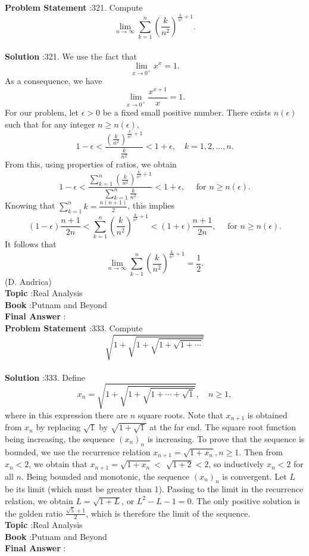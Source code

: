 \documentclass[10pt]{article}
\begin{document}
\textbf{Problem Statement} :321. Compute$$ \lim _{n \rightarrow \infty} \sum_{k=1}^{n}\left(\frac{k}{n^{2}}\right)^{\frac{k}{n^{2}}+1} . $$\\
\textbf{Solution} :321. We use the fact that$$ \lim _{x \rightarrow 0^{+}} x^{x}=1 . $$As a consequence, we have$$ \lim _{x \rightarrow 0^{+}} \frac{x^{x+1}}{x}=1 . $$For our problem, let $\epsilon>0$ be a fixed small positive number. There exists $n(\epsilon)$ such that for any integer $n \geq n(\epsilon)$,$$ 1-\epsilon<\frac{\left(\frac{k}{n^{2}}\right)^{\frac{k}{n^{2}}+1}}{\frac{k}{n^{2}}}<1+\epsilon, \quad k=1,2, \ldots, n . $$From this, using properties of ratios, we obtain$$ 1-\epsilon<\frac{\sum_{k=1}^{n}\left(\frac{k}{n^{2}}\right)^{\frac{k}{n^{2}}+1}}{\sum_{k=1}^{n} \frac{k}{n^{2}}}<1+\epsilon, \quad \text { for } n \geq n(\epsilon) . $$Knowing that $\sum_{k=1}^{n} k=\frac{n(n+1)}{2}$, this implies$$ (1-\epsilon) \frac{n+1}{2 n}<\sum_{k=1}^{n}\left(\frac{k}{n^{2}}\right)^{\frac{k}{n^{2}}+1}<(1+\epsilon) \frac{n+1}{2 n}, \quad \text { for } n \geq n(\epsilon) . $$It follows that$$ \lim _{n \rightarrow \infty} \sum_{k-1}^{n}\left(\frac{k}{n^{2}}\right)^{\frac{k}{n^{2}}+1}=\frac{1}{2} . $$(D. Andrica)\\
\textbf{Topic} :Real Analysis\\
\textbf{Book} :Putnam and Beyond\\
\textbf{Final Answer} :\\


\textbf{Problem Statement} :333. Compute$$ \sqrt{1+\sqrt{1+\sqrt{1+\sqrt{1+\cdots}}}} $$\\
\textbf{Solution} :333. Define$$ x_{n}=\sqrt{1+\sqrt{1+\sqrt{1+\cdots+\sqrt{1}}}}, \quad n \geq 1, $$where in this expression there are $n$ square roots. Note that $x_{n+1}$ is obtained from $x_{n}$ by replacing $\sqrt{1}$ by $\sqrt{1+\sqrt{1}}$ at the far end. The square root function being increasing, the sequence $\left(x_{n}\right)_{n}$ is increasing. To prove that the sequence is bounded, we use the recurrence relation $x_{n+1}=\sqrt{1+x_{n}}, n \geq 1$. Then from $x_{n}<2$, we obtain that $x_{n+1}=\sqrt{1+x_{n}}<$ $\sqrt{1+2}<2$, so inductively $x_{n}<2$ for all $n$. Being bounded and monotonic, the sequence $\left(x_{n}\right)_{n}$ is convergent. Let $L$ be its limit (which must be greater than 1). Passing to the limit in the recurrence relation, we obtain $L=\sqrt{1+L}$, or $L^{2}-L-1=0$. The only positive solution is the golden ratio $\frac{\sqrt{5}+1}{2}$, which is therefore the limit of the sequence.\\
\textbf{Topic} :Real Analysis\\
\textbf{Book} :Putnam and Beyond\\
\textbf{Final Answer} :\\
\end{document}
